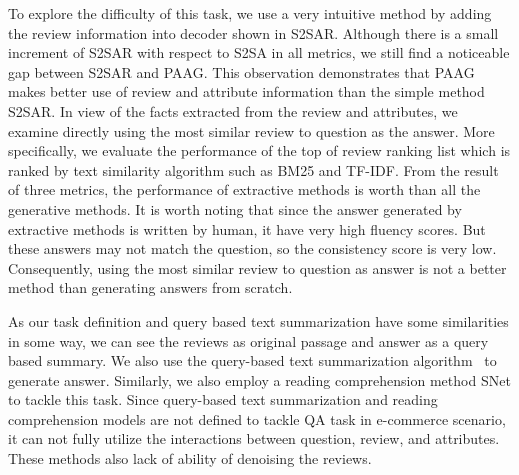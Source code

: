 To explore the difficulty of this task, we use a very intuitive method by adding the review information into decoder shown in S2SAR.
Although there is a small increment of S2SAR with respect to S2SA in all metrics, we still find a noticeable gap between S2SAR and PAAG.
This observation demonstrates that PAAG makes better use of review and attribute information than the simple method S2SAR.
In view of the facts extracted from the review and attributes, we examine directly using the most similar review to question as the answer.
More specifically, we evaluate the performance of the top of review ranking list which is ranked by text similarity algorithm such as BM25 and TF-IDF.
From the result of three metrics, the performance of extractive methods is worth than all the generative methods.
It is worth noting that since the answer generated by extractive methods is written by human, it have very high fluency scores.
But these answers may not match the question, so the consistency score is very low.
Consequently, using the most similar review to question as answer is not a better method than generating answers from scratch.

As our task definition and query based text summarization have some similarities in some way, we can see the reviews as original passage and answer as a query based summary.
We also use the query-based text summarization algorithm~\cite{Hasselqvist2017QueryBasedAS} to generate answer.
Similarly, we also employ a reading comprehension method SNet to tackle this task.
Since query-based text summarization and reading comprehension models are not defined to tackle QA task in e-commerce scenario, it can not fully utilize the interactions between question, review, and attributes.
These methods also lack of ability of denoising the reviews.

